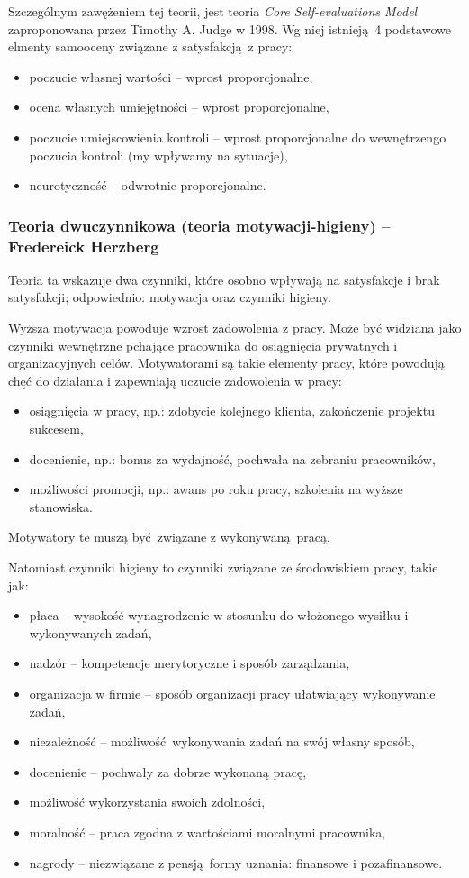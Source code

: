 Szczególnym zawężeniem tej teorii, jest teoria \emph{Core Self-evaluations Model} zaproponowana przez Timothy A. Judge w 1998. Wg niej istnieją 4 podstawowe elmenty samooceny związane z satysfakcją z pracy:
\begin{itemize}
\item poczucie własnej wartości -- wprost proporcjonalne,
\item ocena własnych umiejętności -- wprost proporcjonalne,
\item poczucie umiejscowienia kontroli -- wprost proporcjonalne do wewnętrzengo poczucia kontroli (my wpływamy na sytuacje),
\item neurotyczność -- odwrotnie proporcjonalne.
\end{itemize}

\subsubsection{Teoria dwuczynnikowa (teoria motywacji-higieny) -- Fredereick Herzberg}
Teoria ta wskazuje dwa czynniki, które osobno wpływają na satysfakcje i brak satysfakcji; odpowiednio: motywacja oraz czynniki higieny. 

Wyższa motywacja powoduje wzrost zadowolenia z pracy. Może być widziana jako czynniki wewnętrzne pchające pracownika do osiągnięcia prywatnych i organizacyjnych celów. Motywatorami są takie elementy pracy, które powodują chęć do działania i zapewniają uczucie zadowolenia w pracy:
\begin{itemize}
\item osiągnięcia w pracy, np.: zdobycie kolejnego klienta, zakończenie projektu sukcesem,
\item docenienie, np.: bonus za wydajność, pochwała na zebraniu pracowników,
\item możliwości promocji, np.: awans po roku pracy, szkolenia na wyższe stanowiska.
\end{itemize}
Motywatory te muszą być związane z wykonywaną pracą.

Natomiast czynniki higieny to czynniki związane ze środowiskiem pracy, takie jak:
\begin{itemize}
\item płaca -- wysokość wynagrodzenie w stosunku do włożonego wysiłku i wykonywanych zadań, 
\item nadzór -- kompetencje merytoryczne i sposób zarządzania,
\item organizacja w firmie -- sposób organizacji pracy ułatwiający wykonywanie zadań, 
\item niezależność -- możliwość wykonywania zadań na swój własny sposób,
\item docenienie -- pochwały za dobrze wykonaną pracę,
\item możliwość wykorzystania swoich zdolności,
\item moralność -- praca zgodna z wartościami moralnymi pracownika,
\item nagrody -- niezwiązane z pensją formy uznania: finansowe i pozafinansowe.
\end{itemize}

